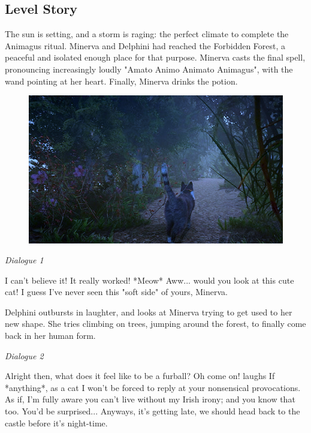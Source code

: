\subsection{Level Story}

The sun is setting, and a storm is raging: the perfect climate to complete the Animagus ritual. Minerva and Delphini had reached the Forbidden Forest, a peaceful and isolated enough place for that purpose. Minerva casts the final spell, pronouncing increasingly loudly "Amato Animo Animato Animagus", with the wand pointing at her heart. Finally, Minerva drinks the potion.

\begin{figure}[H]
\includegraphics[max width=\textwidth]{../Pictures/Level/Script/Minerva_cat_picture.jpg}
\end{figure} 

\textit{Dialogue 1}
\begin{leftbar}
\begin{dialogue}
 I can't believe it! It really worked!
 *Meow* 
 Aww... would you look at this cute cat! I guess I've never seen this "soft side" of yours, Minerva.
\end{dialogue} 
\end{leftbar}

Delphini outbursts in laughter, and looks at Minerva trying to get used to her new shape. She tries climbing on trees, jumping around the forest, to finally come back in her human form. \\

\pagebreak

\textit{Dialogue 2}
\begin{dialogue}
 Alright then, what does it feel like to be a furball?
 Oh come on! \*laughs\* If *anything*, as a cat I won't be forced to reply at your nonsensical provocations.
 As if, I'm fully aware you can't live without my Irish irony; and you know that too.
 You'd be surprised... Anyways, it's getting late, we should head back to the castle before it's night-time.
\end{dialogue} 

